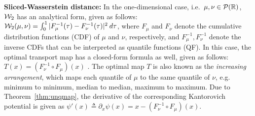 





\textbf{Sliced-Wasserstein distance: }
%
In the one-dimensional case, i.e.\ $\mu,\nu \in {\cal P}(\mathbb{R})$, ${\cal W}_2$ has an analytical form, given as follows:
${\cal W}_2(\mu,\nu) = \int_0^1 |F_\mu^{-1}(\tau) - F_\nu^{-1}(\tau)|^2 \> d\tau$, %
where $F_\mu$ and $F_\nu$ denote the cumulative distribution functions (CDF) of $\mu$ and $\nu$, respectively, and $F^{-1}_\mu, F^{-1}_\nu$ denote the inverse CDFs that can be interpreted as quantile functions (QF).
%
In this case, the optimal transport map has a closed-form formula as well, given as follows: $T(x) = (F_\nu^{-1} \circ F_\mu) (x)$ \cite{villani2008optimal}. The optimal map $T$ is also known as the \emph{increasing arrangement}, which maps each quantile of $\mu$ to the same quantile of $\nu$, e.g. minimum to minimum, median to median, maximum to maximum.
%
Due to Theorem~\ref{thm:unqmap}, the derivative of the corresponding Kantorovich potential is given as $\psi'(x) \triangleq \partial_x \psi(x) = x- (F_\nu^{-1} \circ F_\mu) (x)$.

